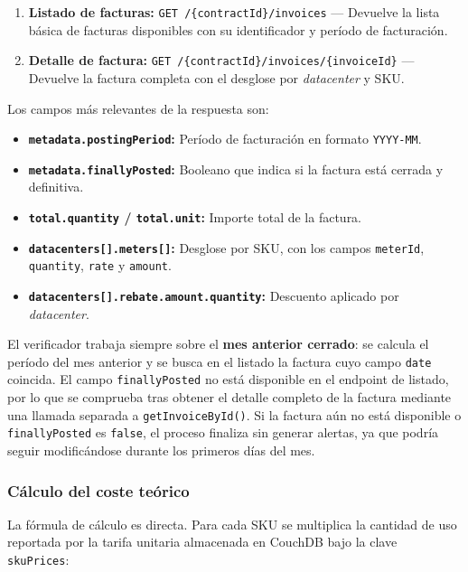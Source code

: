 \begin{enumerate}
    \item \textbf{Listado de facturas:} \texttt{GET /\{contractId\}/invoices} --- Devuelve la lista básica de facturas disponibles con su identificador y período de facturación.
    \item \textbf{Detalle de factura:} \texttt{GET /\{contractId\}/invoices/\{invoiceId\}} --- Devuelve la factura completa con el desglose por \textit{datacenter} y SKU.
\end{enumerate}

Los campos más relevantes de la respuesta son:

\begin{itemize}
    \item \textbf{\texttt{metadata.postingPeriod}:} Período de facturación en formato \texttt{YYYY-MM}.
    \item \textbf{\texttt{metadata.finallyPosted}:} Booleano que indica si la factura está cerrada y definitiva.
    \item \textbf{\texttt{total.quantity} / \texttt{total.unit}:} Importe total de la factura.
    \item \textbf{\texttt{datacenters[].meters[]}:} Desglose por SKU, con los campos \texttt{meterId}, \texttt{quantity}, \texttt{rate} y \texttt{amount}.
    \item \textbf{\texttt{datacenters[].rebate.amount.quantity}:} Descuento aplicado por \textit{datacenter}.
\end{itemize}

El verificador trabaja siempre sobre el \textbf{mes anterior cerrado}: se calcula el período del mes anterior y se busca en el listado la factura cuyo campo \texttt{date} coincida. El campo \texttt{finallyPosted} no está disponible en el endpoint de listado, por lo que se comprueba tras obtener el detalle completo de la factura mediante una llamada separada a \texttt{getInvoiceById()}. Si la factura aún no está disponible o \texttt{finallyPosted} es \texttt{false}, el proceso finaliza sin generar alertas, ya que podría seguir modificándose durante los primeros días del mes.

\subsubsection{Cálculo del coste teórico}

La fórmula de cálculo es directa. Para cada SKU se multiplica la cantidad de uso reportada por la tarifa unitaria almacenada en CouchDB bajo la clave \texttt{skuPrices}:

